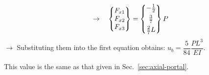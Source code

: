 \begin{example}[2D frame]
\begin{equation*}
  \quad\rightarrow\quad \begin{Bmatrix}F_{x1}\\ F_{x2}\\ F_{x3}\end{Bmatrix} = \begin{Bmatrix}-\frac12\\[4pt] \frac37\\[4pt] \frac27L\end{Bmatrix}P
\end{equation*}
$\rightarrow$ Substituting them into the first equation obtains: $u_b = \dfrac{5}{84}\dfrac{PL^3}{EI}$.

This value is the same as that given in Sec.~\ref{sec:axial-portal}.
\end{example}

